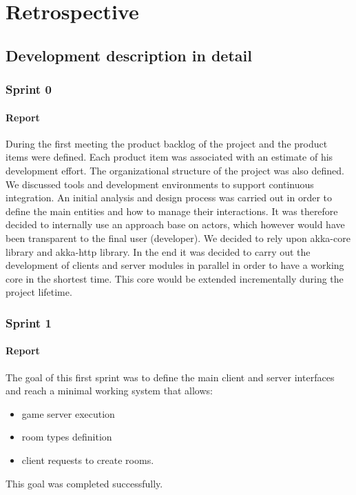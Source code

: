 \chapter{Retrospective}

\section{Development description in detail}

\subsection{Sprint 0}
\subsubsection{Report}
During the first meeting the product backlog of the project and the product items were defined. Each product item was associated with an estimate of his development effort.
The organizational structure of the project was also defined. We discussed tools and development environments to support continuous integration.
An initial analysis and design process was carried out in order to define the main entities and how to manage their interactions.
It was therefore decided to internally use an approach base on actors, which however would have been transparent to the final user (developer). 
We decided to rely upon akka-core library and akka-http library. 
In the end it was decided to carry out the development of clients and server modules in parallel in order to have a working core in the shortest time. This core would be extended incrementally during the project lifetime.







\subsection{Sprint 1}
\subsubsection{Report}
The goal of this first sprint was to define the main client and server interfaces and reach a minimal working system that allows:
\begin{itemize}
	\item game server execution 
	\item room types definition
	\item client requests to create rooms.
\end{itemize}
This goal was completed successfully. 

